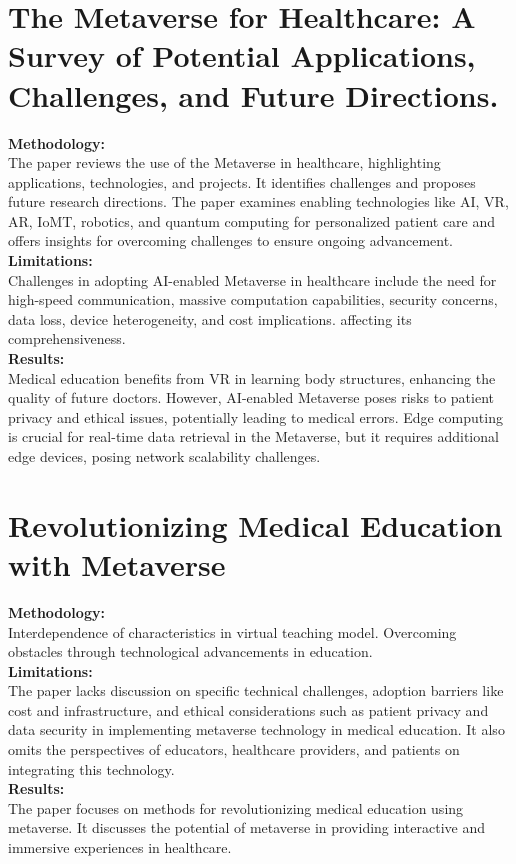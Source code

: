 \section{The Metaverse for Healthcare: A Survey of Potential Applications, Challenges, and Future Directions.\cite{yendurimetaverse}\cite{JournalArticle10}}
\textbf{Methodology:}\\The paper reviews the use of the Metaverse in healthcare, highlighting applications, technologies, and projects. It identifies challenges and proposes future research directions. The paper examines enabling technologies like AI, VR, AR, IoMT, robotics, and quantum computing for personalized patient care and offers insights for overcoming challenges to ensure ongoing advancement.\\
\textbf{Limitations:}\\Challenges in adopting AI-enabled Metaverse in healthcare include the need for high-speed communication, massive computation capabilities, security concerns, data loss, device heterogeneity, and cost implications.  affecting its comprehensiveness.\\
\textbf{Results:}\\
Medical education benefits from VR in learning body structures, enhancing the quality of future doctors. However, AI-enabled Metaverse poses risks to patient privacy and ethical issues, potentially leading to medical errors. Edge computing is crucial for real-time data retrieval in the Metaverse, but it requires additional edge devices, posing network scalability challenges.
\section{Revolutionizing Medical Education with Metaverse\cite{baskar2022revolutionizing}\cite{JournalArticle9}}
\textbf{Methodology:}\\Interdependence of characteristics in virtual teaching model.
Overcoming obstacles through technological advancements in education.\\
\textbf{Limitations:}\\The paper lacks discussion on specific technical challenges, adoption barriers like cost and infrastructure, and ethical considerations such as patient privacy and data security in implementing metaverse technology in medical education. It also omits the perspectives of educators, healthcare providers, and patients on integrating this technology.\\
\textbf{Results:}\\ The paper focuses on methods for revolutionizing medical education using metaverse. It discusses the potential of metaverse in providing interactive and immersive experiences in healthcare.
